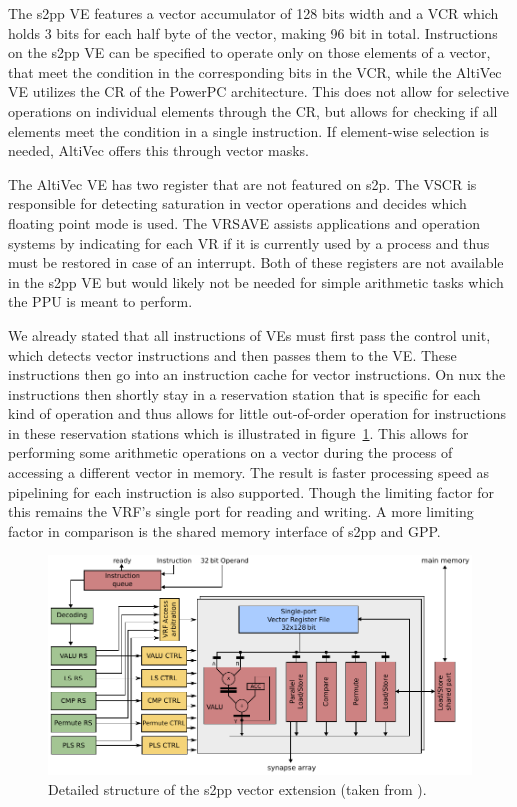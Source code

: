 {The \ac{s2pp} \ac{VE} features a vector accumulator of 128 bits width and a \ac{VCR} which holds 3 bits for each half byte of the vector, making 96 bit in total.
Instructions on the \ac{s2pp} \ac{VE} can be specified to operate only on those elements of a vector, that meet the condition in the corresponding bits in the \ac{VCR}, while the AltiVec \ac{VE} utilizes the \ac{CR} of the PowerPC architecture.
This does not allow for selective operations on individual elements through the \ac{CR}, but allows for checking if all elements meet the condition in a single instruction.
If element-wise selection is needed, AltiVec offers this through vector masks.
    
The AltiVec \ac{VE} has two register that are not featured on s2p.
The \ac{VSCR} is responsible for detecting saturation in vector operations and decides which floating point mode is used.
The \ac{VRSAVE} assists applications and operation systems by indicating for each \ac{VR} if it is currently used by a process and thus must be restored in case of an interrupt.
Both of these registers are not available in the \ac{s2pp} \ac{VE} but would likely not be needed for simple arithmetic tasks which the \ac{PPU} is meant to perform.

We already stated that all instructions of \ac{VE}s must first pass the control unit, which detects vector instructions and then passes them to the \ac{VE}.
These instructions then go into an instruction cache for vector instructions. 
On nux the instructions then shortly stay in a reservation station that is specific for each kind of operation and thus allows for little out-of-order operation for instructions in these reservation stations which is illustrated in figure~\ref{fig:s2pp}.
This allows for performing some arithmetic operations on a vector during the process of accessing a different vector in memory.
The result is faster processing speed as pipelining for each instruction is also supported.
Though the limiting factor for this remains the \ac{VRF}'s single port for reading and writing.
A more limiting factor in comparison is the shared memory interface of \ac{s2pp} and \ac{GPP}.
\begin{figure}[htbp]
    \centering
    \includegraphics[width=\textwidth]{pictures/s2pp.pdf}
    \caption{\label{fig:s2pp} Detailed structure of the \ac{s2pp} vector extension (taken from \cite{PPU}).}
\end{figure}

}
